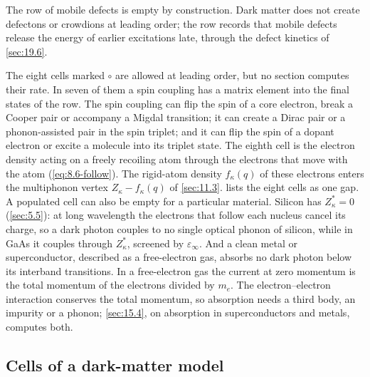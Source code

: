The row of mobile defects is empty by construction. Dark matter does not create defectons or crowdions at leading order; the row records that mobile defects release the energy of earlier excitations late, through the defect kinetics of \cref{sec:19.6}.

The eight cells marked $\circ$ are allowed at leading order, but no section computes their rate. In seven of them a spin coupling has a matrix element into the final states of the row. The spin coupling can flip the spin of a core electron, break a Cooper pair or accompany a Migdal transition; it can create a Dirac pair or a phonon-assisted pair in the spin triplet; and it can flip the spin of a dopant electron or excite a molecule into its triplet state. The eighth cell is the electron density acting on a freely recoiling atom through the electrons that move with the atom (\cref{eq:8.6-follow}). The rigid-atom density $f_\kappa(q)$ of these electrons enters the multiphonon vertex $Z_\kappa - f_\kappa(q)$ of \cref{sec:11.3}.  lists the eight cells as one gap. A populated cell can also be empty for a particular material. Silicon has $Z^*_\kappa = 0$ (\cref{sec:5.5}): at long wavelength the electrons that follow each nucleus cancel its charge, so a dark photon couples to no single optical phonon of silicon, while in GaAs it couples through $Z^*_\kappa$, screened by $\varepsilon_\infty$. And a clean metal or superconductor, described as a free-electron gas, absorbs no dark photon below its interband transitions. In a free-electron gas the current at zero momentum is the total momentum of the electrons divided by $m_e$. The electron--electron interaction conserves the total momentum, so absorption needs a third body, an impurity or a phonon; \cref{sec:15.4}, on absorption in superconductors and metals, computes both.

\subsection{Cells of a dark-matter model}\label{sec:9.1-models}

